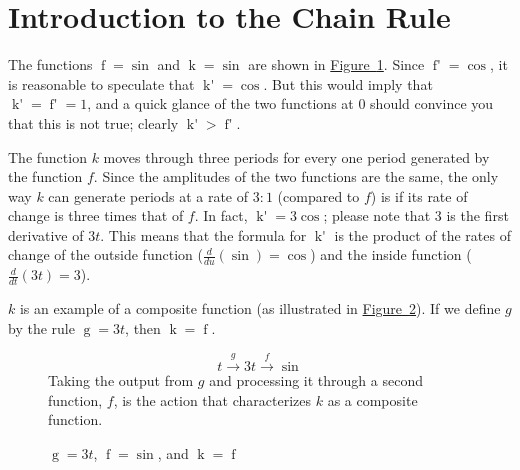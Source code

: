 \documentclass[12pt,]{book}
\theoremstyle{plain}
\theoremstyle{definition}
\numberwithin{equation}{section}
\newcommand{\fe}[2]{\mathop{{#1}{\left(#2\right)}}}
\newcommand{\fd}[1]{#1'}
\newcommand{\lzoo}[2]{{\frac{d}{d#1}}{\left(#2\right)}}
\begin{document}
\section[Introduction to the Chain Rule]{Introduction to the Chain Rule}\label{section-introduction-to-the-chain-rule}
The functions \(\fe{f}{t}=\fe{\sin}{t}\) and \(\fe{k}{t}=\fe{\sin}{3t}\) are shown in \hyperref[figure-sine-waves]{Figure~\ref*{figure-sine-waves}}. Since \(\fe{\fd{f}}{t}=\fe{\cos}{t}\), it is reasonable to speculate that \(\fe{\fd{k}}{t}=\fe{\cos}{3t}\).  But this would imply that \(\fe{\fd{k}}{0}=\fe{\fd{f}}{0}=1\), and a quick glance of the two functions at \(0\) should convince you that this is not true; clearly \(\fe{\fd{k}}{0}>\fe{\fd{f}}{0}\).%
\begin{figure}
\centering
{
}
\caption{\label{figure-sine-waves}}
\end{figure}
\par
The function \(k\) moves through three periods for every one period generated by the function \(f\).  Since the amplitudes of the two functions are the same, the only way \(k\) can generate periods at a rate of \(3:1\) (compared to \(f\)) is if its rate of change is three times that of \(f\).  In fact, \(\fe{\fd{k}}{t}=3\fe{\cos}{3t}\); please note that \(3\) is the first derivative of \(3t\).  This means that the formula for \(\fe{\fd{k}}{t}\) is the product of the rates of change of the outside function (\(\lzoo{u}{\fe{\sin}{u}}=\fe{\cos}{u}\)) and the inside function (\(\lzoo{t}{3t}=3\)).%
\par
\(k\) is an example of a composite function (as illustrated in \hyperref[figure-composite-function]{Figure~\ref*{figure-composite-function}}).  If we define \(g\) by the rule \(\fe{g}{t}=3t\), then \(\fe{k}{t}=\fe{f}{\fe{g}{t}}\).%
\begin{figure}
\centering
\[t\xrightarrow{g}3t\xrightarrow{f}\fe{\sin}{3t}\]Taking the output from \(g\) and processing it through a second function, \(f\), is the action that characterizes \(k\) as a composite function.%
\caption{\(\fe{g}{t}=3t\), \(\fe{f}{u}=\fe{\sin}{u}\), and \(\fe{k}{t}=\fe{f}{\fe{g}{t}}\)\label{figure-composite-function}}
\end{figure}
\end{document}
